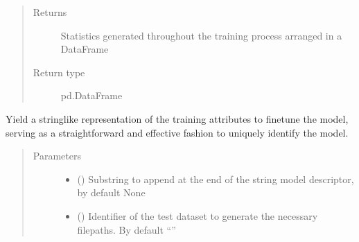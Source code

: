 \documentclass[letterpaper,10pt,english]{sphinxmanual}
\begin{document}
\begin{fulllineitems}
\begin{fulllineitems}
\begin{quote}
\begin{description}
\begin{itemize}
\end{itemize}

\item[{Returns}] \leavevmode
\sphinxAtStartPar
Statistics generated throughout the training process arranged in a DataFrame

\item[{Return type}] \leavevmode
\sphinxAtStartPar
pd.DataFrame

\end{description}\end{quote}

\end{fulllineitems}


\begin{fulllineitems}
\label{\detokenize{code:gpt2_summarizer_train.TrainGPT2Summarizer.attrs_to_str}}
\sphinxAtStartPar
Yield a string\sphinxhyphen{}like representation of the training attributes to fine\sphinxhyphen{}tune the model,
serving as a straightforward and effective fashion to uniquely identify the model.
\begin{quote}\begin{description}
\item[{Parameters}] \leavevmode\begin{itemize}
\item {} 
\sphinxAtStartPar
{} (\sphinxstyleliteralemphasis{\sphinxupquote{, }}) \textendash{} Substring to append at the end of the string model descriptor, by default None

\item {} 
\sphinxAtStartPar
{} () \textendash{} Identifier of the test dataset to generate the necessary filepaths. By default “”

\end{itemize}


\end{description}
\end{quote}
\end{fulllineitems}
\end{fulllineitems}
\end{document}

